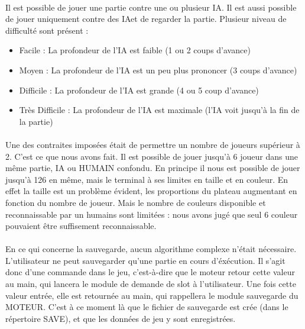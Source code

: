 \documentclass{report}
\begin{document}
        \paragraph*{} %
	Il est possible de jouer une partie contre une ou plusieur IA. Il est aussi possible de jouer uniquement contre des IAet de regarder la partie. 
	Plusieur niveau de difficulté sont présent : \\
	\begin{itemize}
		\item Facile : La profondeur de l'IA est faible (1 ou 2 coups d'avance) 
		\item Moyen : La profondeur de l'IA est un peu plus prononcer (3 coups d'avance) 
		\item Difficile : La profondeur de l'IA est grande (4 ou 5 coup d'avance) 
		\item Très Difficile : La profondeur de l'IA est maximale (l'IA voit jusqu'à la fin de la partie) \\
	\end{itemize}

        \paragraph*{} %
	Une des contraites imposées était de permettre un nombre de joueurs supérieur à 2.
	C'est ce que nous avons fait. Il est possible de jouer jusqu'à 6 joueur dans une même partie, IA ou HUMAIN confondu. 
	En principe il nous est possible de jouer jusqu'à 126 en même, mais le terminal à ses limites en taille et en couleur.
	En effet la taille est un problème évident, les proportions du plateau augmentant en fonction du nombre de joueur.
	Mais le nombre de couleurs disponible et reconnaissable par un humains sont limitées : nous avons jugé que seul 6 couleur pouvaient être suffisement reconnaissable.\\ 

        \paragraph*{} %
	En ce qui concerne la sauvegarde, aucun algorithme complexe n'était nécessaire. L'utilisateur ne peut sauvegarder qu'une partie en cours d'éxécution. Il s'agit donc d'une commande dans le jeu, c'est-à-dire que le moteur retour cette valeur au main, qui lancera le module de demande de slot à l'utilisateur. 
	Une fois cette valeur entrée, elle est retournée au main, qui rappellera le module sauvegarde du MOTEUR.
	C'est à ce moment là que le fichier de sauvegarde est crée (dans le répertoire SAVE), et que les données de jeu y sont enregistrées.\\
	
\end{document}
